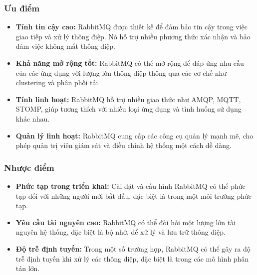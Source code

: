 \subsubsection{Ưu điểm}
\begin{itemize}
  \item \textbf{Tính tin cậy cao:} RabbitMQ được thiết kế để đảm bảo tin cậy trong việc giao tiếp và xử lý thông điệp. Nó hỗ trợ nhiều phương thức xác nhận và bảo đảm việc không mất thông điệp.
  \item \textbf{Khả năng mở rộng tốt:} RabbitMQ có thể mở rộng để đáp ứng nhu cầu của các ứng dụng với lượng lớn thông điệp thông qua các cơ chế như clustering và phân phối tải
  \item \textbf{Tính linh hoạt:} RabbitMQ hỗ trợ nhiều giao thức như AMQP, MQTT, STOMP, giúp tương thích với nhiều loại ứng dụng và tình huống sử dụng khác nhau.
  \item \textbf{Quản lý linh hoạt:} RabbitMQ cung cấp các công cụ quản lý mạnh mẽ, cho phép quản trị viên giám sát và điều chỉnh hệ thống một cách dễ dàng.
\end{itemize}
\subsubsection{Nhược điểm}
\begin{itemize}
  \item \textbf{Phức tạp trong triển khai:} Cài đặt và cấu hình RabbitMQ có thể phức tạp đối với những người mới bắt đầu, đặc biệt là trong một môi trường phức tạp.
  \item \textbf{Yêu cầu tài nguyên cao:} RabbitMQ có thể đòi hỏi một lượng lớn tài nguyên hệ thống, đặc biệt là bộ nhớ, để xử lý và lưu trữ thông điệp.
  \item \textbf{Độ trễ định tuyến:} Trong một số trường hợp, RabbitMQ có thể gây ra độ trễ định tuyến khi xử lý các thông điệp, đặc biệt là trong các mô hình phân tán lớn.
\end{itemize}